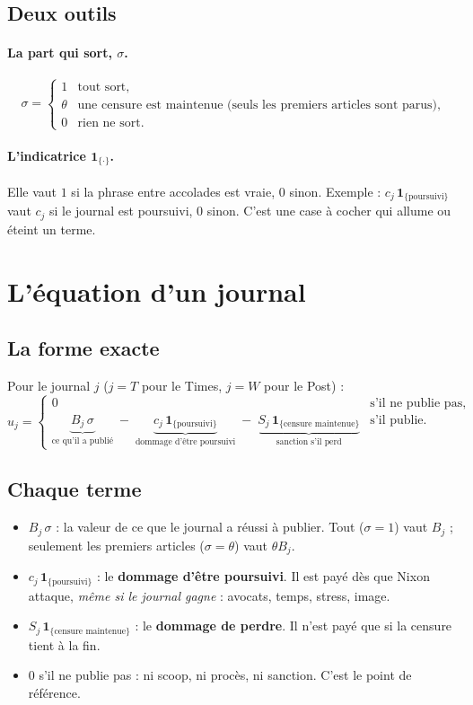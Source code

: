 \documentclass[11pt,a4paper]{article}
\theoremstyle{definition}
\newcommand{\ind}[1]{\mathbf{1}_{\{\text{#1}\}}}
\begin{document}
\subsection{Deux outils}
\paragraph{La part qui sort, $\sigma$.}
\[
\sigma=\begin{cases}1 & \text{tout sort,}\\ \theta & \text{une censure est maintenue (seuls les premiers articles sont parus),}\\ 0 & \text{rien ne sort.}\end{cases}
\]
\paragraph{L'indicatrice $\mathbf{1}_{\{\cdot\}}$.} Elle vaut $1$ si la phrase entre accolades est vraie, $0$ sinon. Exemple : $c_j\,\ind{poursuivi}$ vaut $c_j$ si le journal est poursuivi, $0$ sinon. C'est une case à cocher qui allume ou éteint un terme.

\section{L'équation d'un journal}

\subsection{La forme exacte}
Pour le journal $j$ ($j=T$ pour le Times, $j=W$ pour le Post) :
\begin{equation}
u_j=\begin{cases}
0 & \text{s'il ne publie pas,}\\[4pt]
\underbrace{B_j\,\sigma}_{\text{ce qu'il a publié}}\;-\;\underbrace{c_j\,\ind{poursuivi}}_{\text{dommage d'être poursuivi}}\;-\;\underbrace{S_j\,\ind{censure maintenue}}_{\text{sanction s'il perd}} & \text{s'il publie.}
\end{cases}\label{eq:uj}
\end{equation}

\subsection{Chaque terme}
\begin{itemize}[leftmargin=*,itemsep=2pt]
\item $B_j\,\sigma$ : la valeur de ce que le journal a réussi à publier. Tout ($\sigma=1$) vaut $B_j$ ; seulement les premiers articles ($\sigma=\theta$) vaut $\theta B_j$.
\item $c_j\,\ind{poursuivi}$ : le \textbf{dommage d'être poursuivi}. Il est payé dès que Nixon attaque, \emph{même si le journal gagne} : avocats, temps, stress, image.
\item $S_j\,\ind{censure maintenue}$ : le \textbf{dommage de perdre}. Il n'est payé que si la censure tient à la fin.
\item $0$ s'il ne publie pas : ni scoop, ni procès, ni sanction. C'est le point de référence.
\end{itemize}
\end{document}
